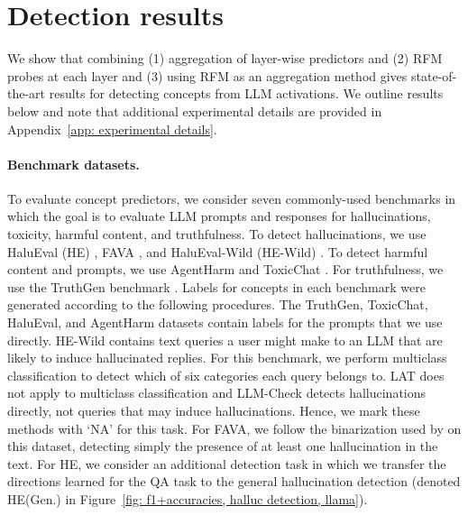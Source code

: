 \section{Detection results}
We show that combining (1) aggregation of layer-wise predictors and (2) RFM probes at each layer and (3) using RFM as an aggregation method gives state-of-the-art results for detecting concepts from LLM activations.  We outline results below and note that additional experimental details are provided in  Appendix~\ref{app: experimental details}.



\paragraph{Benchmark datasets.} To evaluate concept predictors, we consider seven commonly-used benchmarks in which the goal is to evaluate LLM prompts and responses for hallucinations, toxicity, harmful content, and truthfulness.  To detect hallucinations, we use HaluEval (HE) \citep{halueval}, FAVA \citep{fava}, and HaluEval-Wild (HE-Wild) \citep{haluevalwild}. To detect harmful content and prompts, we use AgentHarm \citep{agentharm} and ToxicChat \citep{toxicchat}. For truthfulness, we use the TruthGen benchmark \citep{truthgen}.  Labels for concepts in each benchmark were generated according to the following procedures.  The TruthGen, ToxicChat, HaluEval, and AgentHarm datasets contain labels for the prompts that we use directly. HE-Wild contains text queries a user might make to an LLM that are likely to induce hallucinated replies. For this benchmark, we perform multiclass classification to detect which of six categories each query belongs to. LAT \citep{representation_engineering} does not apply to multiclass classification and LLM-Check \citep{LLMcheck} detects hallucinations directly, not queries that may induce hallucinations. Hence, we mark these methods with `NA' for this task. For FAVA, we follow the binarization used by \citet{LLMcheck} on this dataset, detecting simply the presence of at least one hallucination in the text. For HE, we consider an additional detection task in which we transfer the directions learned for the QA task to the general hallucination detection (denoted HE(Gen.) in Figure~\ref{fig: f1+accuracies, halluc detection, llama}). 



